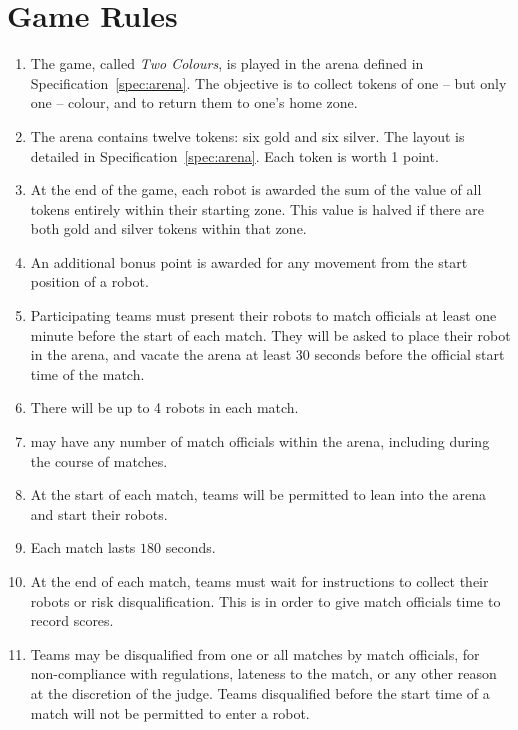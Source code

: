 \section{Game Rules}
\label{sec:rules}

\begin{enumerate}
  \item The game, called \emph{Two Colours}, is played in the arena defined in
        Specification~\ref{spec:arena}. The objective is to collect tokens of
        one -- but only one -- colour, and to return them to one's home zone.
  \item The arena contains twelve tokens: six gold and six silver. The layout
        is detailed in Specification~\ref{spec:arena}. Each token is worth 1
        point.
  \item At the end of the game, each robot is awarded the sum of the value of
        all tokens entirely within their starting zone. This value is halved
        if there are both gold and silver tokens within that zone.
  \item An additional bonus point is awarded for any movement from the start
        position of a robot.
  \item Participating teams must present their robots to match officials at
        least one minute before the start of each match. They will be asked to
        place their robot in the arena, and vacate the arena at least 30 seconds
        before the official start time of the match.
  \item There will be up to 4 robots in each match.
  \item \org may have any number of match officials within the arena, including
        during the course of matches.
  \item At the start of each match, teams will be permitted to lean into the
        arena and start their robots.
  \item Each match lasts $180$ seconds.
  \item At the end of each match, teams must wait for instructions to collect
        their robots or risk disqualification. This is in order to give match
        officials time to record scores.
  \item Teams may be disqualified from one or all matches by match officials,
        for non-compliance with regulations, lateness to the match, or any other
        reason at the discretion of the judge. Teams disqualified before the
        start time of a match will not be permitted to enter a robot.
\end{enumerate}

